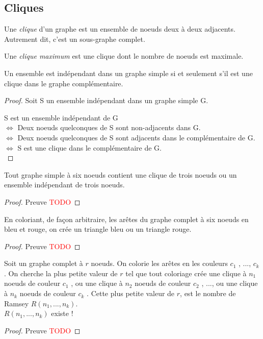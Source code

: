 \subsection{Cliques}
\begin{mydef}
  Une \emph{clique} d’un graphe est un ensemble de noeuds deux à deux adjacents. Autrement dit, c’est un sous-graphe complet.
\end{mydef}

\begin{mydef}
  Une \emph{clique maximum} est une clique dont le nombre de noeuds est maximale.
\end{mydef}

\begin{mytheo}
  Un ensemble est indépendant dans un graphe simple si et seulement s’il est une clique dans le graphe complémentaire.
  \begin{proof}
     Soit S un ensemble indépendant dans un graphe simple G.
     
     S est un ensemble indépendant de G \\
     $\Leftrightarrow$ Deux noeuds quelconques de S sont non-adjacents dans G. \\
     $\Leftrightarrow$ Deux noeuds quelconques de S sont adjacents dans le complémentaire de G. \\
     $\Leftrightarrow$ S est une clique dans le complémentaire de G.\\
  \end{proof}
\end{mytheo}

\begin{mytheo} 
  Tout graphe simple à six noeuds contient une clique de trois noeuds ou un ensemble indépendant de trois noeuds.
  \begin{proof}
     Preuve \textcolor{red}{TODO}
  \end{proof}
\end{mytheo}

\begin{mytheo} 
  En coloriant, de façon arbitraire, les arêtes du graphe complet à six noeuds en bleu et rouge, on crée un triangle bleu ou un triangle rouge.
  \begin{proof}
     Preuve \textcolor{red}{TODO}
  \end{proof}
\end{mytheo}

\begin{mytheo} 
  Soit un graphe complet à $r$ noeuds. On colorie les arêtes en les couleurs $c_1$ , ..., $c_k$ . On cherche la plus petite valeur de $r$ tel que tout coloriage crée une clique à $n_1$ noeuds de couleur $c_1$ , ou une clique à $n_2$ noeuds de couleur $c_2$ , ..., ou une clique à $n_k$ noeuds de couleur $c_k$ . Cette plus petite valeur de $r$, est le nombre de Ramsey $R(n_1 , ..., n_k)$.\\
  $R(n_1 , ..., n_k)$ existe !
  \begin{proof}
     Preuve \textcolor{red}{TODO}
  \end{proof}
\end{mytheo}


